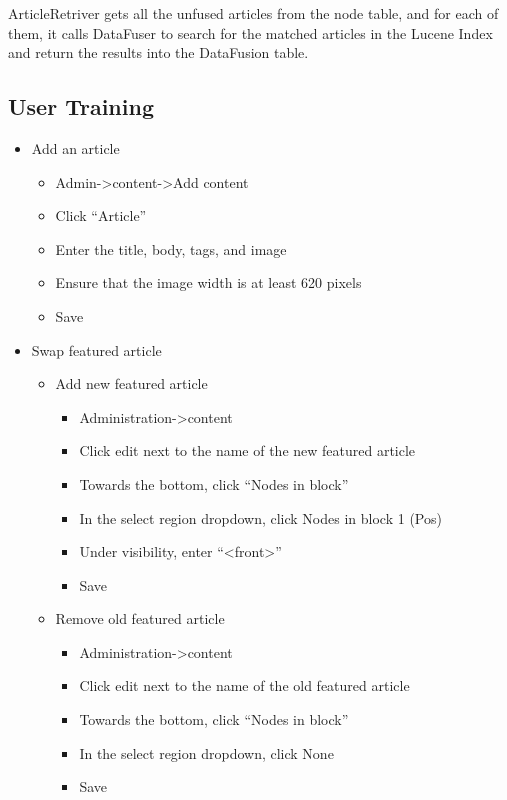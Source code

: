\documentclass[11pt]{article} %
\begin{document}
ArticleRetriver gets all the unfused articles from the node table, and for each of them, it calls DataFuser to search for the matched articles in the Lucene Index and return the results into the DataFusion table. 

\subsection{User Training}

\begin{itemize}
\itemindent 0pt
\item Add an article
	\begin{itemize}
	\itemindent 10pt
	\item Admin->content->Add content
	\item Click “Article”
	\item Enter the title, body, tags, and image
	\item Ensure that the image width is at least 620 pixels
	\item Save
	\end{itemize}
\item Swap featured article
	\begin{itemize}
	\itemindent 10pt
	\item Add new featured article
		\begin{itemize}
		\itemindent 20pt
		\item Administration->content
		\item Click edit next to the name of the new featured article
		\item Towards the bottom, click “Nodes in block”
		\item In the select region dropdown, click Nodes in block 1 (Pos)
		\item Under visibility, enter “<front>”
		\item Save
		\end{itemize}
	\item Remove old featured article
		\begin{itemize}
		\itemindent 20pt
		\item Administration->content
		\item Click edit next to the name of the old featured article
		\item Towards the bottom, click “Nodes in block”
		\item In the select region dropdown, click None
		\item Save
		\end{itemize}

\end{itemize}
\end{itemize}
\end{document}
